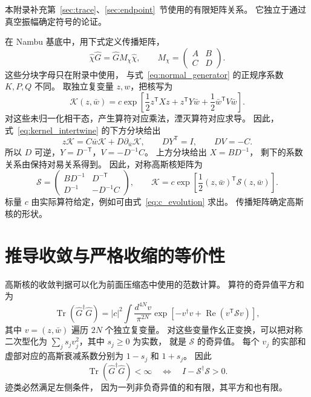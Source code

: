 \documentclass[UTF8,11pt,a4paper,fontset=fandol]{ctexart}
\newcommand{\Tr}{\operatorname{Tr}}
\newcommand{\trans}{\mathsf T}
\numberwithin{equation}{section}
\begin{document}
本附录补充第~\ref{sec:trace}、\ref{sec:endpoint}~节使用的有限矩阵关系。
它独立于通过真空振幅确定符号的论证。

在 Nambu 基底中，用下式定义传播矩阵，
\begin{equation}
 \hat\chi\hat G=\hat G M_\chi\hat\chi,
 \qquad
 M_\chi=\begin{pmatrix}A&B\\C&D\end{pmatrix}.
 \label{eq:kernel_intertwine}
\end{equation}
这些分块字母只在附录中使用，
与式~\eqref{eq:normal_generator} 的正规序系数 $K,P,Q$ 不同。
取独立复变量 $z,w$，把核写为
\begin{equation}
 \mathcal K(z,\bar w)=c\exp\!\left[
 \frac12 z^\trans Xz+z^\trans Y\bar w
 +\frac12\bar w^\trans V\bar w\right].
 \label{eq:appendix_kernel}
\end{equation}
对这些未归一化相干态，产生算符对应乘法，湮灭算符对应求导。
因此，式~\eqref{eq:kernel_intertwine} 的下方分块给出
\begin{equation}
 z\mathcal K=C\bar w\mathcal K+D\partial_{\bar w}\mathcal K,
 \qquad DY^\trans=I,\qquad DV=-C.
\end{equation}
所以 $D$ 可逆，$Y=D^{-\trans}$，$V=-D^{-1}C$。
上方分块给出 $X=BD^{-1}$，
剩下的系数关系由保持对易关系得到。
因此，对称高斯核矩阵为
\begin{equation}
 \mathcal S=
 \begin{pmatrix}
 BD^{-1}&D^{-\trans}\\
 D^{-1}&-D^{-1}C
 \end{pmatrix},
 \qquad
 \mathcal K=c\exp\!\left[\frac12
 (z,\bar w)^\trans\mathcal S(z,\bar w)\right].
 \label{eq:kernel_S}
\end{equation}
标量 $c$ 由实际算符给定，例如可由式~\eqref{eq:c_evolution} 求出。
传播矩阵确定高斯核的形状。

\section{推导收敛与严格收缩的等价性}
\label{app:convergence}

高斯核的收敛判据可以化为前面压缩态中使用的范数计算。
算符的奇异值平方和为
\begin{equation}
 \Tr(\hat G^\dagger\hat G)
 =|c|^2\int\frac{d^{4N}v}{\pi^{2N}}
 \exp\!\left[-v^\dagger v+\operatorname{Re}(v^\trans\mathcal Sv)\right],
 \label{eq:kernel_norm_integral}
\end{equation}
其中 $v=(z,\bar w)$ 遍历 $2N$ 个独立复变量。
对这些变量作幺正变换，可以把对称二次型化为
$\sum_js_jv_j^2$，其中 $s_j\geq0$ 为实数，
就是 $\mathcal S$ 的奇异值。
每个 $v_j$ 的实部和虚部对应的高斯衰减系数分别为
$1-s_j$ 和 $1+s_j$。
因此
\begin{equation}
 \Tr(\hat G^\dagger\hat G)<\infty
 \quad\Longleftrightarrow\quad
 I-\mathcal S^\dagger\mathcal S>0.
 \label{eq:kernel_norm_test}
\end{equation}
迹类必然满足左侧条件，
因为一列非负奇异值的和有限，其平方和也有限。
\end{document}
